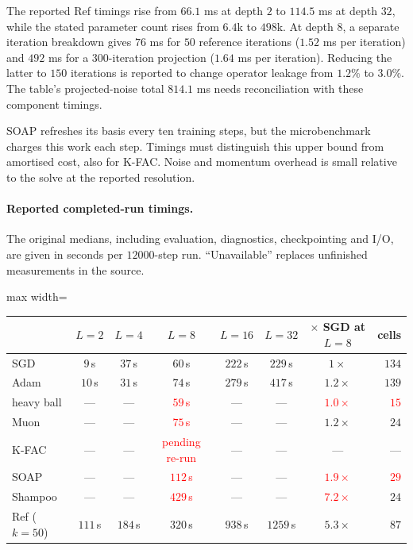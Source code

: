\documentclass{article}
\newcommand{\nat}[1]{\textcolor{red}{#1}}
\theoremstyle{definition}
\theoremstyle{remark}
\begin{document}
The reported Ref timings rise from $66.1$ ms at depth $2$ to $114.5$ ms at depth $32$, while the stated parameter count rises from $6.4$k to $498$k. At depth $8$, a separate iteration breakdown gives $76$ ms for $50$ reference iterations ($1.52$ ms per iteration) and $492$ ms for a $300$-iteration projection ($1.64$ ms per iteration). Reducing the latter to $150$ iterations is reported to change operator leakage from $1.2\%$ to $3.0\%$. The table's projected-noise total $814.1$ ms needs reconciliation with these component timings.

SOAP refreshes its basis every ten training steps, but the microbenchmark charges this work each step. Timings must distinguish this upper bound from amortised cost, also for K-FAC. Noise and momentum overhead is small relative to the solve at the reported resolution.

\paragraph{Reported completed-run timings.}
The original medians, including evaluation, diagnostics, checkpointing and I/O, are given in seconds per $12000$-step run. ``Unavailable'' replaces unfinished measurements in the source.

\begin{center}\small
\begin{adjustbox}{max width=\linewidth}
\begin{tabular}{lccccccr}
\toprule
 & $L=2$ & $L=4$ & $L=8$ & $L=16$ & $L=32$ & $\times$ SGD at $L=8$ & cells \\
\midrule
SGD   & $9$\,s   & $37$\,s  & $60$\,s  & $222$\,s & $229$\,s  & $1\times$ & $134$ \\
Adam               & $10$\,s  & $31$\,s  & $74$\,s  & $279$\,s & $417$\,s  & $1.2\times$ & $139$ \\
heavy ball         & ---      & ---      & \nat{$59$\,s} & ---      & ---       & \nat{$1.0\times$} & \nat{$15$} \\
Muon               & ---      & ---      & \nat{$75$\,s}  & ---      & ---       & $1.2\times$ & $24$ \\
K-FAC              & ---      & ---      & \nat{pending re-run} & ---      & ---       & --- & --- \\
SOAP               & ---      & ---      & \nat{$112$\,s} & ---      & ---       & \nat{$1.9\times$} & \nat{$29$} \\
Shampoo            & ---      & ---      & \nat{$429$\,s} & ---      & ---       & \nat{$7.2\times$} & $24$ \\
\midrule
Ref ($k=50$) & $111$\,s & $184$\,s & $320$\,s & $938$\,s & $1259$\,s & $\mathbf{5.3\times}$ & $87$ \\
\bottomrule
\end{tabular}
\end{adjustbox}
\end{center}
\end{document}
